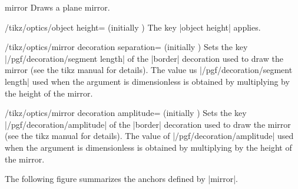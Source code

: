 \documentclass[a4paper]{ltxdoc}
\begin{document}
\begin{shape}{mirror}
Draws a plane mirror.

\begin{codeexample}[width=6cm]
\end{codeexample}

\begin{key}{/tikz/optics/object height= (initially )}
    The key |object height| applies.
\end{key}

\begin{key}{/tikz/optics/mirror decoration separation= (initially )}
Sets the key |/pgf/decoration/segment length| of the |border| decoration used to draw the mirror (see the tikz manual for details).
The value us |/pgf/decoration/segment length| used when the argument is dimensionless is obtained by multiplying  by the height of the mirror.
\end{key}

\begin{key}{/tikz/optics/mirror decoration amplitude= (initially )}
Sets the key |/pgf/decoration/amplitude| of the |border| decoration used to draw the mirror (see the tikz manual for details).
The value of |/pgf/decoration/amplitude| used when the argument is dimensionless is obtained by multiplying  by the height of the mirror.
\end{key}

The following figure summarizes the anchors defined by |mirror|.

\begin{codeexample}[]
\Huge
{}
\end{codeexample}

\end{shape}
\end{document}

